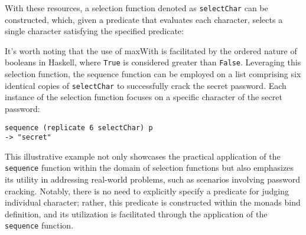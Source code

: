 \documentclass[runningheads]{llncs}
\begin{document}
\begin{Shaded}
\begin{Highlighting}[]
 \OtherTok{=\textgreater{}}\NormalTok{ [a] }\OtherTok{{-}\textgreater{}}\OtherTok{{-}\textgreater{}}\OtherTok{{-}\textgreater{}}
\OtherTok{=}
\OperatorTok{:}\OperatorTok{:}\OperatorTok{|}\OperatorTok{\textgreater{}}\OtherTok{=}\OperatorTok{:}
                   \OperatorTok{|}      \OtherTok{=}\OperatorTok{:}
\end{Highlighting}
\end{Shaded}

With these resources, a selection function denoted as
\texttt{selectChar} can be constructed, which, given a predicate that
evaluates each character, selects a single character satisfying the
specified predicate:

\begin{Shaded}
\begin{Highlighting}[]
   
\OtherTok{=}\NormalTok{ maxWith [}\NormalTok{]}
\end{Highlighting}
\end{Shaded}

It's worth noting that the use of maxWith is facilitated by the ordered
nature of booleans in Haskell, where \texttt{True} is considered greater
than \texttt{False}. Leveraging this selection function, the sequence
function can be employed on a list comprising six identical copies of
\texttt{selectChar} to successfully crack the secret password. Each
instance of the selection function focuses on a specific character of
the secret password:

\begin{verbatim}
sequence (replicate 6 selectChar) p
-> "secret"
\end{verbatim}

This illustrative example not only showcases the practical application
of the \texttt{sequence} function within the domain of selection
functions but also emphasizes its utility in addressing real-world
problems, such as scenarios involving password cracking. Notably, there
is no need to explicitly specify a predicate for judging individual
character; rather, this predicate is constructed within the monads bind
definition, and its utilization is facilitated through the application
of the \texttt{sequence} function.
\end{document}
